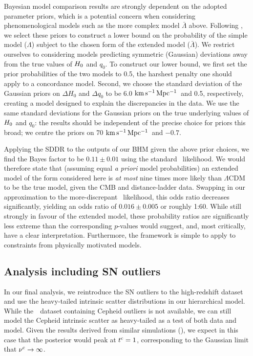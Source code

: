 \documentclass[a4paper,fleqn,usenatbib]{mnras}
\newcommand{\riess}{\citetalias{Riess_etal:2016}}
\newcommand{\tpeak}{t}
\newcommand{\msame}{\Lambda}
\newcommand{\mdiff}{\bar{\Lambda}}
\newcommand{\decel}{\ensuremath{q_0}}
\newcommand{\dofc}{\ensuremath{\nu^{\rm c}}}
\newcommand{\tpeakc}{\ensuremath{\tpeak^{\rm c}}}
\newcommand{\kmsmpc}{\ensuremath{{\rm km\,s^{-1}\,Mpc^{-1}}}}
\newcommand{\dhubble}{\ensuremath{\Delta H_0}}
\newcommand{\ddecel}{\ensuremath{\Delta q_0}}
\begin{document}
{Bayesian model comparison results are strongly dependent on the adopted parameter priors, which is a potential concern when considering phenomenological models such as the more complex model $\bar{\Lambda}$ above. Following , we select these priors to construct a lower bound on the probability of the simple model ($\msame$) subject to the chosen form of the extended model ($\mdiff$). We restrict ourselves to considering models predicting symmetric (Gaussian) deviations away from the true values of $H_0$ and $\decel$. To construct our lower bound, we first set the prior probabilities of the two models to 0.5, the harshest penalty one should apply to a concordance model. Second, we choose the standard deviation of the Gaussian priors on $\dhubble$ and $\ddecel$ to be 6.0 \kmsmpc\ and 0.5, respectively, creating a model designed to explain the discrepancies in the data. We use the same standard deviations for the Gaussian priors on the true underlying values of $H_0$ and $\decel$: the results should be independent of the precise choice for priors this broad; we centre the priors on 70 \kmsmpc\ and $-0.7$.

Applying the SDDR to the outputs of our BHM given the above prior choices, we find the Bayes factor to be $0.11 \pm 0.01$ using the standard~\citet{Planck_XIII:2016} likelihood. We would therefore state that (assuming equal {\it a priori} model probabilities) an extended model of the form considered here is {\em at most} nine times more likely than $\Lambda$CDM to be the true model, given the CMB and distance-ladder data. Swapping in our approximation to the more-discrepant~\citet{Planck_Int_XLVI:2016} likelihood, this odds ratio decreases significantly, yielding an odds ratio of $0.016 \pm 0.005$ or roughly 1:60. While still strongly in favour of the extended model, these probability ratios are significantly less extreme than the corresponding $p$-values would suggest, and, most critically, have a clear interpretation. Furthermore, the framework is simple to apply to constraints from physically motivated models. 

\subsection{Analysis including SN outliers}

In our final analysis, we reintroduce the SN outliers to the high-redshift dataset and use the heavy-tailed intrinsic scatter distributions in our hierarchical model. While the~\riess\ dataset containing Cepheid outliers is not available, we can still model the Cepheid intrinsic scatter as heavy-tailed as a test of both data and model. Given the results derived from similar simulations (), we expect in this case that the posterior would peak at $\tpeakc = 1$, corresponding to the Gaussian limit that $\dofc \rightarrow \infty$.

}
\end{document}
